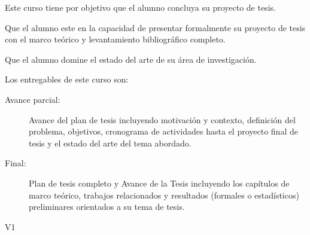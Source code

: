 \begin{syllabus}


\begin{justification}
Este curso tiene por objetivo que el alumno concluya su proyecto de tesis.
\end{justification}

\begin{goals}
\item Que el alumno este en la capacidad de presentar formalmente su proyecto de tesis con el marco teórico y levantamiento bibliográfico completo.
\item Que el alumno domine el estado del arte de su área de investigación.
\item Los entregables de este curso son:
	\begin{description}
	\item [Avance parcial:] Avance del plan de tesis incluyendo motivación y contexto, definición del problema, objetivos, cronograma de actividades hasta el proyecto final de tesis y el estado del arte del tema abordado.
	\item [Final:] Plan de tesis completo y Avance de la Tesis incluyendo los capítulos de marco teórico, trabajos relacionados y resultados (formales o estadísticos) preliminares orientados a su tema de tesis.
	\end{description}
\end{goals}

\begin{outcomes}{V1}
    \item {}
    \item {}
    \item {}
    \item {}
    \item {}
    \item {}
    \item {}
    \item {}
    \item {}
    \item {}
    \item {}
\end{outcomes}


\end{syllabus}
